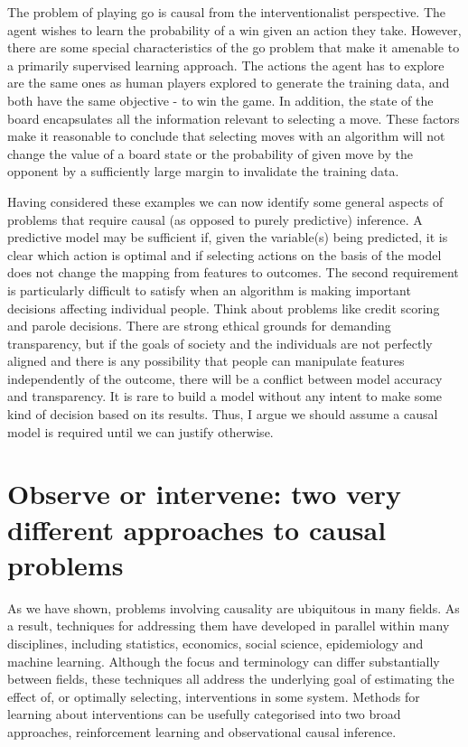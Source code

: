 \documentclass[11pt,a4paper,twoside]{report}
\theoremstyle{plain}
\theoremstyle{definition}
\begin{document}
The problem of playing go is causal from the interventionalist perspective. The agent wishes to learn the probability of a win given an action they take. However, there are some special characteristics of the go problem that make it amenable to a primarily supervised learning approach. The actions the agent has to explore are the same ones as human players explored to generate the training data, and both have the same objective - to win the game. In addition, the state of the board encapsulates all the information relevant to selecting a move. These factors make it reasonable to conclude that selecting moves with an algorithm will not change the value of a board state or the probability of given move by the opponent by a sufficiently large margin to invalidate the training data. 
 
Having considered these examples we can now identify some general aspects of problems that require causal (as opposed to purely predictive) inference. A predictive model may be sufficient if, given the variable(s) being predicted, it is clear which action is optimal and if selecting actions on the basis of the model does not change the mapping from features to outcomes. The second requirement is particularly difficult to satisfy when an algorithm is making important decisions affecting individual people. Think about problems like credit scoring and parole decisions. There are strong ethical grounds for demanding transparency, but if the goals of society and the individuals are not perfectly aligned and there is any possibility that people can manipulate features independently of the outcome, there will be a conflict between model accuracy and transparency. It is rare to build a model without any intent to make some kind of decision based on its results. Thus, I argue we should assume a causal model is required until we can justify otherwise.  

\section{Observe or intervene: two very different approaches to causal problems}

As we have shown, problems involving causality are ubiquitous in many fields. As a result, techniques for addressing them have developed in parallel within many disciplines, including statistics, economics, social science, epidemiology and machine learning. Although the focus and terminology can differ substantially between fields, these techniques all address the underlying goal of estimating the effect of, or optimally selecting, interventions in some system. Methods for learning about interventions can be usefully categorised into two broad approaches, reinforcement learning and observational causal inference. 
\end{document}
